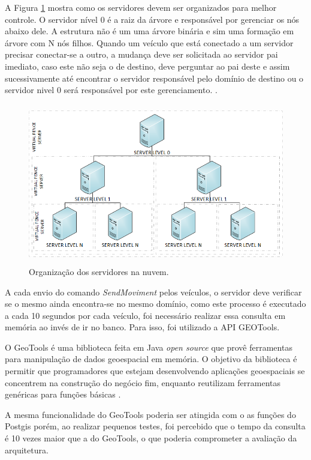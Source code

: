 \documentclass[
	12pt,				%
	oneside,			%
	a4paper,			%
	english,			%
	brazil				%
	]{abntex2ppgsi}
\begin{document}
A Figura \ref{fig:dServidores} mostra como os servidores devem ser organizados para melhor controle. O servidor nível 0 é a raiz da árvore e responsável por gerenciar os nós abaixo dele. A estrutura não é um uma árvore binária e sim uma formação em árvore com N nós filhos. Quando um veículo que está conectado a um servidor precisar conectar-se a outro, a mudança deve ser solicitada ao servidor pai imediato, caso este não seja o de destino, deve perguntar ao pai deste e assim sucessivamente até encontrar o servidor responsável pelo domínio de destino ou o servidor nivel 0 será responsável por este gerenciamento.
.
\begin{figure}[!h]
	\centering
	\includegraphics [width=12cm,height=7cm] {images/servidores.png}
	\caption{Organização dos servidores na nuvem.}
	\label{fig:dServidores}
\end{figure}

A cada envio do comando \textit{SendMoviment} pelos veículos, o servidor deve verificar se o mesmo ainda encontra-se no mesmo domínio, como este processo é executado a cada 10 segundos por cada veículo, foi necessário realizar essa consulta em memória ao invés de ir no banco. Para isso, foi utilizado a API GEOTools.

O GeoTools é uma biblioteca feita em Java \textit{open source} que provê ferramentas para manipulação de dados geoespacial em memória. O objetivo da biblioteca é permitir que programadores que estejam desenvolvendo aplicações geoespaciais se concentrem na construção do negócio fim, enquanto reutilizam ferramentas genéricas para funções básicas \cite{hall2008open}.

A mesma funcionalidade do GeoTools poderia ser atingida com o as funções do Postgis porém, ao realizar pequenos testes, foi percebido que o tempo da consulta é 10 vezes maior que a do GeoTools, o que poderia comprometer a avaliação da arquitetura.
\end{document}
